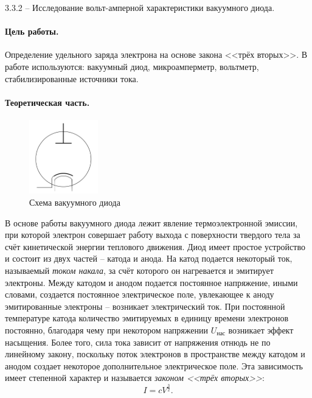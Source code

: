 \documentclass{lab_class}
\begin{document}
{\Large 3.3.2 -- Исследование вольт-амперной характеристики вакуумного диода.}

\paragraph{Цель работы.}
Определение удельного заряда электрона на основе закона <<трёх вторых>>.
В работе используются: вакуумный диод, микроамперметр, вольтметр, стабилизированные источники тока.

\paragraph{Теоретическая часть.}

\begin{figure}
\centering
\includegraphics[width=3cm]{vacuum_diode.png}
\caption{Схема вакуумного диода}
\end{figure}

В основе работы вакуумного диода лежит явление термоэлектронной эмиссии, при которой электрон совершает работу выхода с поверхности твердого тела за счёт кинетической энергии теплового движения. Диод имеет простое устройство и состоит из двух частей -- катода и анода. На катод подается некоторый ток, называемый \emph{током накала}, за счёт которого он нагревается и эмитирует электроны. Между катодом и анодом подается постоянное напряжение, иными словами, создается постоянное электрическое поле, увлекающее к аноду эмитированные электроны -- возникает электрический ток. При постоянной температуре катода количество эмитируемых в единицу времени электронов постоянно, благодаря чему при некотором напряжении $U_{\text{нас}}$ возникает эффект насыщения. Более того, сила тока зависит от напряжения отнюдь не по линейному закону, поскольку поток электронов в пространстве между катодом и анодом создает некоторое дополнительное электрическое поле. Эта зависимость имеет степенной характер и называется \emph{законом <<трёх вторых>>}:
\begin{equation}
	I = c V^{\frac{3}{2}}.
\end{equation}
\end{document}
